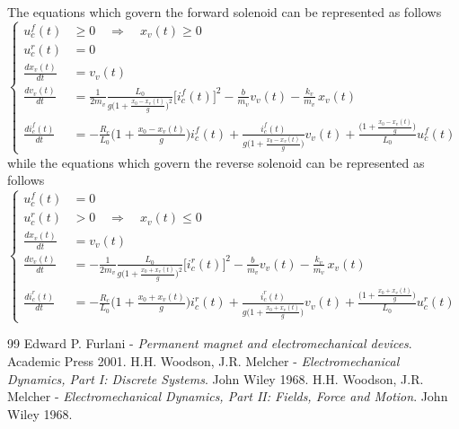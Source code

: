 \documentclass[12pt,a4paper,oneside]{book}
\begin{document}
\begin{onehalfspace}
The equations which govern the forward solenoid can be represented as follows 
\begin{equation}\label{solenoid_mech_eq_5}
	\left\lbrace \begin{aligned}
		u_c^f(t)&\ge0 \quad \Rightarrow \quad x_v(t)\ge 0 \\[6pt]
		u_c^r(t)&=0\\[6pt]
		\frac{dx_v(t)}{dt} &= v_v(t) \\[6pt]
		\frac{dv_v(t)}{dt} &= \frac{1}{2m_v}\frac{L_0}{g\Big(1+\frac{x_0 - x_v(t)}{g}\Big)^2}\Big[i_c^f(t)\Big]^2-\frac{b}{m_v} v_v(t) - \frac{k_v}{m_v}\,x_v(t)\\[6pt]
		\frac{di_c^f(t)}{dt} &=-\frac{R_c}{L_0}\Big(1+\frac{x_0 - x_v(t)}{g}\Big)i_c^f(t)+\frac{i_c^f(t)}{g\Big(1+\frac{x_0 - x_v(t)}{g}\Big)}v_v(t) +\frac{\Big(1+\frac{x_0 - x_v(t)}{g}\Big)}{L_0}u_c^f(t)
	\end{aligned}\right. 
\end{equation}
while the equations which govern the reverse solenoid can be represented as follows 
\begin{equation}\label{solenoid_mech_eq_6}
	\left\lbrace \begin{aligned}
		u_c^f(t)&=0 \\[6pt]
		u_c^r(t)&>0 \quad \Rightarrow \quad x_v(t)\le 0 \\[6pt]
		\frac{dx_v(t)}{dt} &= v_v(t) \\[6pt]
		\frac{dv_v(t)}{dt} &= -\frac{1}{2m_v}\frac{L_0}{g\Big(1+\frac{x_0 + x_v(t)}{g}\Big)^2}\Big[i_c^r(t)\Big]^2-\frac{b}{m_v} v_v(t) - \frac{k_v}{m_v}\,x_v(t)\\[6pt]
		\frac{di_c^r(t)}{dt} &=-\frac{R_c}{L_0}\Big(1+\frac{x_0 + x_v(t)}{g}\Big)i_c^r(t)+\frac{i_c^r(t)}{g\Big(1+\frac{x_0 + x_v(t)}{g}\Big)}v_v(t) +\frac{\Big(1+\frac{x_0 + x_v(t)}{g}\Big)}{L_0}u_c^r(t)
	\end{aligned}\right. 
\end{equation}

\end{onehalfspace}

\clearpage
\begin{thebibliography}{99}
	 Edward P. Furlani - \textit{Permanent magnet and electromechanical devices}. Academic Press 2001.	
	 H.H. Woodson, J.R. Melcher - \textit{Electromechanical Dynamics, Part I: Discrete Systems}. John Wiley 1968.
	 H.H. Woodson, J.R. Melcher - \textit{Electromechanical Dynamics, Part II: Fields, Force and Motion}. John Wiley 1968.
\end{thebibliography}
\end{document}
